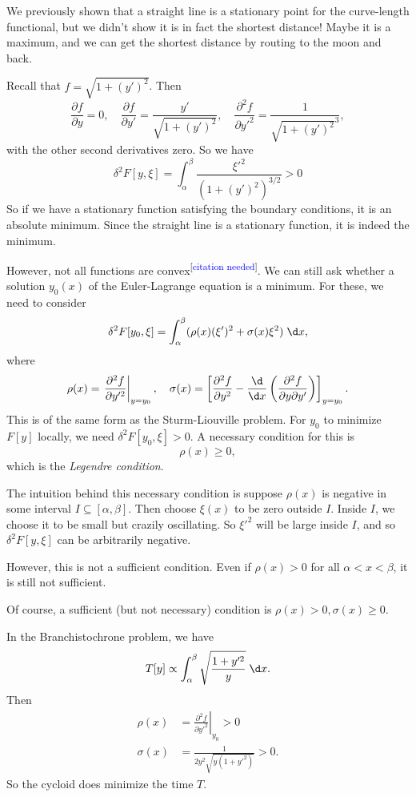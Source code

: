 \documentclass[a4paper]{article}
\begin{document}
\begin{eg}
  We previously shown that a straight line is a stationary point for the curve-length functional, but we didn't show it is in fact the shortest distance! Maybe it is a maximum, and we can get the shortest distance by routing to the moon and back.

  Recall that $f = \sqrt{1 + (y')^2}$. Then
  \[
    \frac{\partial f}{\partial y} = 0,\quad \frac{\partial f}{\partial y'} = \frac{y'}{\sqrt{1 + (y')^2}},\quad \frac{\partial^2 f}{\partial y'^2} = \frac{1}{\sqrt{1 + (y')^2}^3},
  \]
  with the other second derivatives zero. So we have
  \[
    \delta ^2 F[y, \xi] = \int_\alpha^\beta \frac{\xi'^2}{(1 + (y')^2)^{3/2}} > 0
  \]
  So if we have a stationary function satisfying the boundary conditions, it is an absolute minimum. Since the straight line is a stationary function, it is indeed the minimum.
\end{eg}
However, not all functions are convex\textsuperscript{[\textcolor{blue}{citation needed}]}. We can still ask whether a solution $y_0(x)$ of the Euler-Lagrange equation is a minimum. For these, we need to consider
\[
  \delta^2 F[y_0, \xi] = \int_\alpha^\beta (\rho(x)(\xi')^2 + \sigma(x) \xi^2)\;\d x,
\]
where
\[
  \rho(x) = \left.\frac{\partial^2 f}{\partial y'^2}\right|_{y = y_0},\quad
  \sigma(x) = \left[\frac{\partial^2 f}{\partial y^2} - \frac{\d}{\d x}\left(\frac{\partial^2 f}{\partial y \partial y'}\right)\right]_{y = y_0}.
\]
This is of the same form as the Sturm-Liouville problem. For $y_0$ to minimize $F[y]$ locally, we need $\delta^2 F[y_0, \xi] > 0$. A necessary condition for this is
\[
  \rho(x) \geq 0,
\]
which is the \emph{Legendre condition}.

The intuition behind this necessary condition is suppose $\rho (x)$ is negative in some interval $I \subseteq [\alpha, \beta]$. Then choose $\xi(x)$ to be zero outside $I$. Inside $I$, we choose it to be small but crazily oscillating. So $\xi'^2$ will be large inside $I$, and so $\delta^2 F[y, \xi]$ can be arbitrarily negative.

However, this is not a sufficient condition. Even if $\rho (x) > 0$ for all $\alpha < x < \beta$, it is still not sufficient.

Of course, a sufficient (but not necessary) condition is $\rho(x) > 0, \sigma(x) \geq 0$.

\begin{eg}
  In the Branchistochrone problem, we have
  \[
    T[y] \propto \int_\alpha^\beta \sqrt{\frac{1 + y'^2}{y}}\;\d x.
  \]
  Then
  \begin{align*}
    \rho(x) &= \left.\frac{\partial^2 f}{\partial y'^2}\right|_{y_0} > 0\\
    \sigma(x) &= \frac{1}{2y^2\sqrt{y(1 + y'^2)}} > 0.
  \end{align*}
  So the cycloid does minimize the time $T$.
\end{eg}
\end{document}
